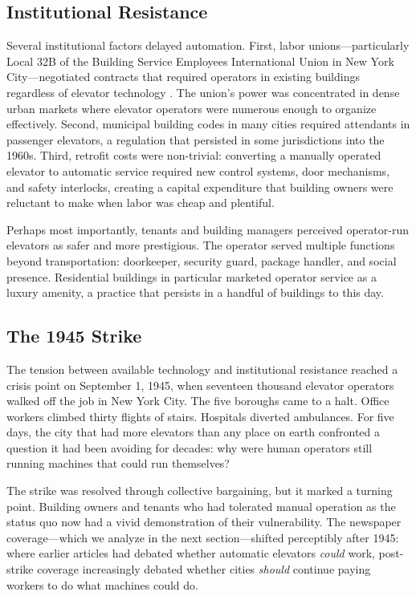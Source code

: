 \documentclass[12pt]{article}
\begin{document}
\subsection{Institutional Resistance}

Several institutional factors delayed automation. First, labor unions---particularly Local 32B of the Building Service Employees International Union in New York City---negotiated contracts that required operators in existing buildings regardless of elevator technology \citep{gray2013}. The union's power was concentrated in dense urban markets where elevator operators were numerous enough to organize effectively. Second, municipal building codes in many cities required attendants in passenger elevators, a regulation that persisted in some jurisdictions into the 1960s. Third, retrofit costs were non-trivial: converting a manually operated elevator to automatic service required new control systems, door mechanisms, and safety interlocks, creating a capital expenditure that building owners were reluctant to make when labor was cheap and plentiful.

Perhaps most importantly, tenants and building managers perceived operator-run elevators as safer and more prestigious. The operator served multiple functions beyond transportation: doorkeeper, security guard, package handler, and social presence. Residential buildings in particular marketed operator service as a luxury amenity, a practice that persists in a handful of buildings to this day.

\subsection{The 1945 Strike}

The tension between available technology and institutional resistance reached a crisis point on September 1, 1945, when seventeen thousand elevator operators walked off the job in New York City. The five boroughs came to a halt. Office workers climbed thirty flights of stairs. Hospitals diverted ambulances. For five days, the city that had more elevators than any place on earth confronted a question it had been avoiding for decades: why were human operators still running machines that could run themselves?

The strike was resolved through collective bargaining, but it marked a turning point. Building owners and tenants who had tolerated manual operation as the status quo now had a vivid demonstration of their vulnerability. The newspaper coverage---which we analyze in the next section---shifted perceptibly after 1945: where earlier articles had debated whether automatic elevators \emph{could} work, post-strike coverage increasingly debated whether cities \emph{should} continue paying workers to do what machines could do.
\end{document}
